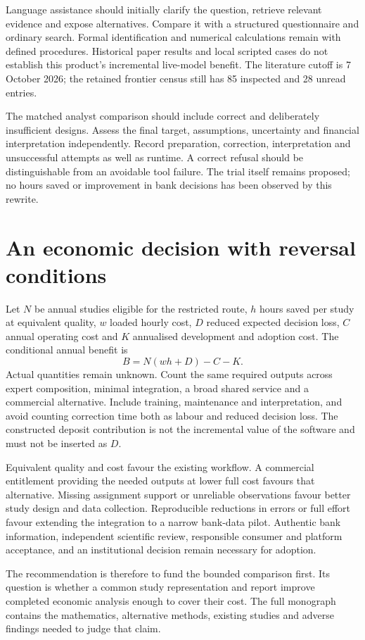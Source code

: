 Language assistance should initially clarify the question, retrieve relevant
evidence and expose alternatives. Compare it with a structured questionnaire
and ordinary search. Formal identification and numerical calculations remain
with defined procedures. Historical paper results and local scripted cases
do not establish this product's incremental live-model benefit. The
literature cutoff is 7 October 2026; the retained frontier census still has
85 inspected and 28 unread entries.

The matched analyst comparison should include correct and deliberately
insufficient designs. Assess the final target, assumptions, uncertainty and
financial interpretation independently. Record preparation, correction,
interpretation and unsuccessful attempts as well as runtime. A correct
refusal should be distinguishable from an avoidable tool failure. The trial
itself remains proposed; no hours saved or improvement in bank decisions
has been observed by this rewrite.

\section*{An economic decision with reversal conditions}
Let $N$ be annual studies eligible for the restricted route, $h$ hours saved
per study at equivalent quality, $w$ loaded hourly cost, $D$ reduced expected
decision loss, $C$ annual operating cost and $K$ annualised development and
adoption cost. The conditional annual benefit is
\[ B=N(wh+D)-C-K. \]
Actual quantities remain unknown. Count the same required outputs across
expert composition, minimal integration, a broad shared service and a
commercial alternative. Include training, maintenance and interpretation,
and avoid counting correction time both as labour and reduced decision loss.
The constructed deposit contribution is not the incremental value of the
software and must not be inserted as $D$.

Equivalent quality and cost favour the existing workflow. A commercial
entitlement providing the needed outputs at lower full cost favours that
alternative. Missing assignment support or unreliable observations favour
better study design and data collection. Reproducible reductions in errors
or full effort favour extending the integration to a narrow bank-data
pilot. Authentic bank information, independent scientific review, responsible
consumer and platform acceptance, and an institutional decision remain
necessary for adoption.

The recommendation is therefore to fund the bounded comparison first. Its
question is whether a common study representation and report improve
completed economic analysis enough to cover their cost. The full monograph
contains the mathematics, alternative methods, existing studies and adverse
findings needed to judge that claim.

